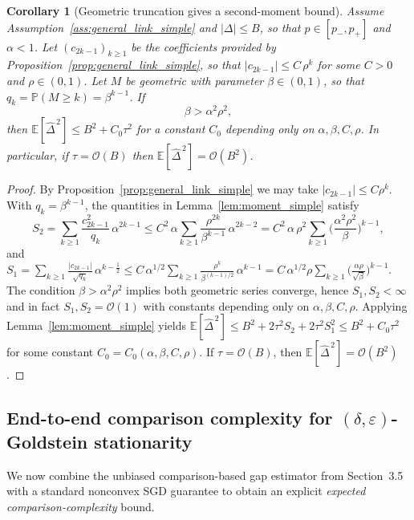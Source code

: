 \documentclass[11pt]{article}
\theoremstyle{plain}
\newtheorem{corollary}[theorem]{Corollary}
\theoremstyle{remark}
\newcommand{\E}{\mathbb{E}}
\newcommand{\Prob}{\mathbb{P}}
\newcommand{\1}{\mathbf{1}}
\begin{document}
\begin{propbox}
\begin{corollary}[Geometric truncation gives a second-moment bound]\label{cor:moment_geometric_simple}
Assume Assumption~\ref{ass:general_link_simple} and $|\Delta|\le B$, so that $p\in[p_-,p_+]$ and $\alpha<1$.
Let $(c_{2k-1})_{k\ge1}$ be the coefficients provided by
Proposition~\ref{prop:general_link_simple}, so that $|c_{2k-1}|\le C\,\rho^k$ for some $C>0$ and $\rho\in(0,1)$.
Let $M$ be geometric with parameter $\beta\in(0,1)$, so that $q_k=\Prob(M\ge k)=\beta^{k-1}$.
If
$$
\beta>\alpha^2\rho^{2},
$$
then $\E[\widehat\Delta^{\,2}]\le B^2 + C_0\tau^2$ for a constant $C_0$ depending only on
$\alpha,\beta,C,\rho$. In particular, if $\tau=\mathcal O(B)$ then
$\E[\widehat\Delta^{\,2}]=\mathcal O(B^2)$.
\end{corollary}
\end{propbox}

\begin{proof}
By Proposition~\ref{prop:general_link_simple} we may take $|c_{2k-1}|\le C\rho^k$.
With $q_k=\beta^{k-1}$, the quantities in Lemma~\ref{lem:moment_simple} satisfy
\[
S_2
=
\sum_{k\ge1}\frac{c_{2k-1}^2}{q_k}\,\alpha^{2k-1}
\le
C^2\,\alpha\sum_{k\ge1}\frac{\rho^{2k}}{\beta^{k-1}}\,\alpha^{2k-2}
=
C^2\,\alpha\,\rho^2\sum_{k\ge1}\Big(\frac{\alpha^2\rho^{2}}{\beta}\Big)^{k-1},
\]
and
$
S_1
=
\sum_{k\ge1}\frac{|c_{2k-1}|}{\sqrt{q_k}}\,\alpha^{k-\frac12}
\le
C\,\alpha^{1/2}\sum_{k\ge1}\frac{\rho^{k}}{\beta^{(k-1)/2}}\,\alpha^{k-1}
=
C\,\alpha^{1/2}\rho\sum_{k\ge1}\Big(\frac{\alpha\rho}{\sqrt{\beta}}\Big)^{k-1}.$
The condition $\beta>\alpha^2\rho^{2}$ implies both geometric series converge, hence $S_1,S_2<\infty$ and in fact
$S_1,S_2=\mathcal O(1)$ with constants depending only on $\alpha,\beta,C,\rho$. Applying Lemma~\ref{lem:moment_simple} yields
$
\E[\widehat\Delta^{\,2}]
\le
B^2 + 2\tau^2 S_2 + 2\tau^2 S_1^2
\le
B^2 + C_0\tau^2
$
for some constant $C_0=C_0(\alpha,\beta,C,\rho)$.
If $\tau=\mathcal O(B)$, then $\E[\widehat\Delta^{\,2}]=\mathcal O(B^2)$.
\end{proof}

\subsection{End-to-end comparison complexity for $(\delta,\varepsilon)$-Goldstein stationarity}
\label{sec:main_theorem}

We now combine the unbiased comparison-based gap estimator from Section~3.5 with a standard
nonconvex SGD guarantee to obtain an explicit \emph{expected comparison-complexity} bound.
\end{document}

